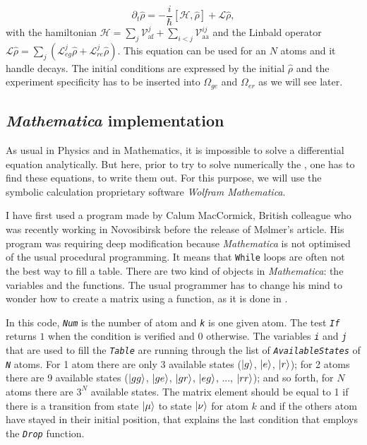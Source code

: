 \documentclass[twoside, open=right
]{scrreprt}
\newcommand{\ff}{\ensuremath{\ket{g}}\xspace}
\newcommand{\ee}{\ensuremath{\ket{e}}\xspace}
\newcommand{\rr}{\ensuremath{\ket{r}}\xspace}
\newcommand{\mat}{\emph{Mathematica}\xspace}
\newcommand{\matC}[1]{\textsl{\texttt{#1}}}
\newcommand{\Om}{\Omega}
\newcommand{\mc}[1]{\mathcal{#1}}
\newcommand{\hrho}{\hat{\rho}}
\begin{document}
\begin{equation}
\partial_t \hrho = -\frac{i}{\hbar} [\mc{H}, \hrho] +  \mc{L} \hrho , 
\label{master-eq}
\end{equation}
with the hamiltonian  $\mc{H} = \sum_j \mc{V}_{\mathrm{af}}^j + \sum_{i<j} \mc{V}_{\mathrm{aa}}^{ij}$ and the Linbald operator $\mc{L} \hrho =  \sum_j (\mc{L}_{eg}^j \hrho + \mc{L}_{re}^j \hrho)$. This equation can be used for an $N$ atoms and it handle decays. The initial conditions are expressed by the initial $\hrho$ and the experiment specificity has to be inserted into $\Om_{ge}$ and $\Om_{er}$ as we will see later. 

\subsection{\mat implementation}

\par As usual in Physics and in Mathematics, it is impossible to solve a differential equation analytically. But here, prior to try to solve numerically the , one has to find these equations, to write them out. For this purpose, we will use the symbolic calculation proprietary software \emph{Wolfram Mathematica}.

\par I have first used a program made by Calum MacCormick, British colleague who was recently working in Novosibirsk before the release of Mølmer's article. His program was requiring deep modification because \mat is not optimised of the usual procedural programming. It means that \texttt{While} loops are often not the best way to fill a table. There are two kind of objects in \mat: the variables and the functions. The usual programmer has to change his mind to wonder how to create a matrix using a function, as it is done in .
\par In this code, \matC{Num} is the number of atom and \matC{k} is one given atom. The test \matC{If} returns $1$ when the condition is verified and $0$ otherwise. The variables \matC{i} and \matC{j} that are used to fill the \matC{Table} are running through the list of \matC{AvailableStates} of \matC{N} atoms. For 1 atom there are only 3 available states (\ff, \ee, \rr); for 2 atoms there are 9 available states ($\ket{gg}$, $\ket{ge}$, $\ket{gr}$, $\ket{eg}$, ..., $\ket{rr}$); and so forth, for $N$ atoms there are $3^N$ available states. The matrix element should be equal to 1 if there is a transition from state $\ket{\mu}$ to state $\ket{\nu}$ for atom $k$ and if the others atom have stayed in their initial position, that explains the last condition that employs the \matC{Drop} function.
\end{document}
